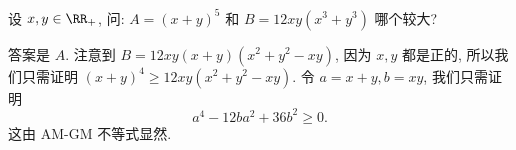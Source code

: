 \begin{prob}
\label{prob:prob-5}
设 $x, y \in \RR_+$, 问: $A = (x + y)^5$
和 $B = 12xy(x^3 + y^3)$ 哪个较大?
\end{prob}

\begin{soln}
答案是 $\boxed{A.}$ 注意到 $B = 12xy(x + y)(x^2 + y^2 - xy)$,
因为 $x, y$ 都是正的, 所以我们只需证明 $(x+y)^4 \ge 12xy(x^2 + y^2 - xy)$.
令 $a = x + y, b = xy$, 我们只需证明
\[
a^4 - 12ba^2 + 36b^2 \ge 0.
\]
这由 AM-GM 不等式显然.
\end{soln}
